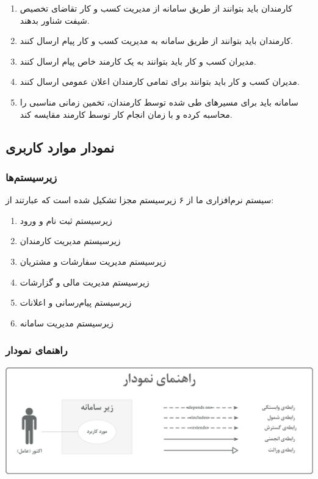 \begin{enumerate}
\item کارمندان باید بتوانند از طریق سامانه از مدیریت کسب و کار تقاضای تخصیص شیفت شناور بدهند.
\item کارمندان باید بتوانند از طریق سامانه به مدیریت کسب و کار پیام ارسال کنند.
\item مدیران کسب و کار باید بتوانند به یک کارمند خاص پیام ارسال کنند.
\item مدیران کسب و کار باید بتوانند برای تمامی کارمندان اعلان عمومی ارسال کنند.
\item سامانه باید برای مسیر‌های طی شده توسط کارمندان، تخمین زمانی مناسبی را محاسبه کرده و با زمان انجام کار توسط کارمند مقایسه کند.
\end{enumerate}

\subsection{نمودار موارد کاربری}


\subsubsection{زیرسیستم‌ها}
سیستم نرم‌افزاری ما از ۶ زیرسیستم مجزا تشکیل شده است که عبارتند از:

\begin{enumerate}
\item زیرسیستم ثبت نام و ورود
\item زیرسیستم مدیریت کارمندان
\item زیرسیستم مدیریت سفارشات و مشتریان
\item زیرسیستم مدیریت مالی و گزارشات
\item زیرسیستم پیام‌رسانی و اعلانات
\item زیرسیستم مدیریت سامانه
\end{enumerate}


\subsubsection{راهنمای نمودار}
\includegraphics[width = \textwidth]{images/legend}
